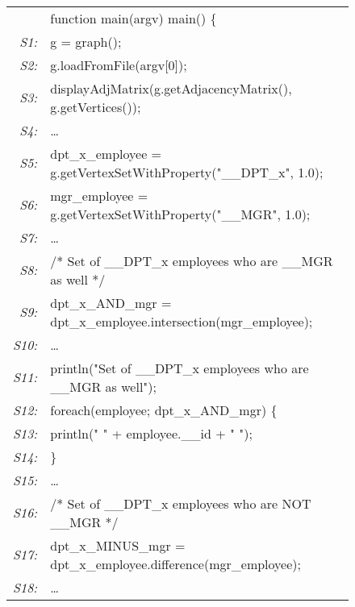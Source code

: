 \begin{figure}
\begin{center}
      {\small \tt
        \begin{tabular}[b]{rl}
          &function main(argv) main() \{ \\
          {\em \scriptsize S1:}&  \quad  g = graph();\\
          {\em \scriptsize S2:}&  \quad  g.loadFromFile(argv[0]);\\
          {\em \scriptsize S3:}&  \quad  
          displayAdjMatrix(g.getAdjacencyMatrix(), g.getVertices()); \\
          {\em \scriptsize S4:}&  \quad  \ldots \\
          {\em \scriptsize S5:}&  \quad  dpt\_x\_employee  = 
          g.getVertexSetWithProperty("\_\_DPT\_x", 1.0); \\
          {\em \scriptsize S6:}&  \quad  mgr\_employee    = 
          g.getVertexSetWithProperty("\_\_MGR", 1.0); \\
          {\em \scriptsize S7:}&  \quad  \ldots \\
          {\em \scriptsize S8:}&  \quad /* Set of \_\_DPT\_x employees who are 
                                           \_\_MGR as well */  \\
          {\em \scriptsize S9:}&  \quad dpt\_x\_AND\_mgr = 
          dpt\_x\_employee.intersection(mgr\_employee); \\
          {\em \scriptsize S10:}&  \quad  \ldots \\
          {\em \scriptsize S11:}&  \quad println("Set of \_\_DPT\_x employees 
          who are \_\_MGR as well");  \\
          {\em \scriptsize S12:}&  \quad foreach(employee; dpt\_x\_AND\_mgr) \{ 
          \\
          {\em \scriptsize S13:}&  \quad \quad println(" " + employee.\_\_id + " 
          "); \\
          {\em \scriptsize S14:}&  \quad \}   \\
          {\em \scriptsize S15:}&  \quad  \ldots \\
          {\em \scriptsize S16:}&  \quad /* Set of \_\_DPT\_x employees who are 
                                            NOT  \_\_MGR */ \\
          {\em \scriptsize S17:}&  \quad dpt\_x\_MINUS\_mgr = 
          dpt\_x\_employee.difference(mgr\_employee); \\
          {\em \scriptsize S18:}&  \quad    \ldots \\

\end{tabular}}
\end{center}
\end{figure}

